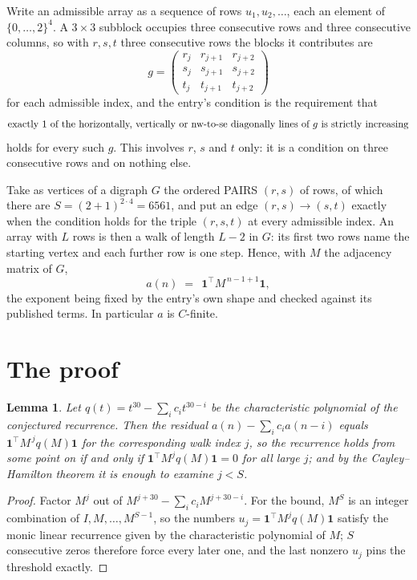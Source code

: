 \documentclass[11pt,a4paper]{article}
\theoremstyle{plain}
\newtheorem{lemma}[theorem]{Lemma}
\theoremstyle{definition}
\begin{document}
Write an admissible array as a sequence of rows $u_1,u_2,\dots$, each an element of
$\{0,\dots,2\}^{4}$. A $3\times3$ subblock occupies three consecutive rows and
three consecutive columns, so with $r,s,t$ three consecutive rows the blocks it
contributes are
\[
g=\begin{pmatrix}r_j&r_{j+1}&r_{j+2}\\ s_j&s_{j+1}&s_{j+2}\\ t_j&t_{j+1}&t_{j+2}\end{pmatrix}
\]
for each admissible index, and the entry's condition is the requirement that
\[
\text{exactly }1\text{ of the horizontally, vertically or nw-to-se diagonally lines of }g\text{ \text{is strictly increasing}}
\]
holds for every such $g$. This involves $r$, $s$ and $t$ only: it is a condition on
three consecutive rows and on nothing else.

Take as vertices of a digraph $G$ the ordered PAIRS $(r,s)$ of rows, of which there are
$S=(2+1)^{2\cdot4}=6561$, and put an edge $(r,s)\to(s,t)$ exactly when the condition
holds for the triple $(r,s,t)$ at every admissible index. An array with $L$ rows is then a
walk of length $L-2$ in $G$: its first two rows name the starting vertex and each further
row is one step. Hence, with $M$ the adjacency matrix of $G$,
\[
a(n)\;=\;\,\mathbf{1}^{\!\top}M^{\,n-1+1}\mathbf{1},
\]
the exponent being fixed by the entry's own shape and checked against its published terms.
In particular $a$ is $C$-finite.

\section{The proof}

\begin{lemma}\label{lem:crit}
Let $q(t)=t^{30}-\sum_i c_it^{30-i}$ be the characteristic polynomial of the
conjectured recurrence. Then the residual $a(n)-\sum_ic_ia(n-i)$ equals
$\mathbf{1}^{\!\top}M^{\,j}q(M)\mathbf{1}$ for the corresponding walk index
$j$, so the recurrence holds from some point on if and only if
$\mathbf{1}^{\!\top}M^{j}q(M)\mathbf{1}=0$ for all large $j$; and by the
Cayley--Hamilton theorem it is enough to examine $j<S$.
\end{lemma}

\begin{proof}
Factor $M^{j}$ out of $M^{j+30}-\sum_ic_iM^{j+30-i}$. For the bound, $M^{S}$
is an integer combination of $I,M,\dots,M^{S-1}$, so the numbers
$u_j=\mathbf{1}^{\!\top}M^{j}q(M)\mathbf{1}$ satisfy the monic linear recurrence given by
the characteristic polynomial of $M$; $S$ consecutive zeros therefore force every later one,
and the last nonzero $u_j$ pins the threshold exactly.
\end{proof}
\end{document}
